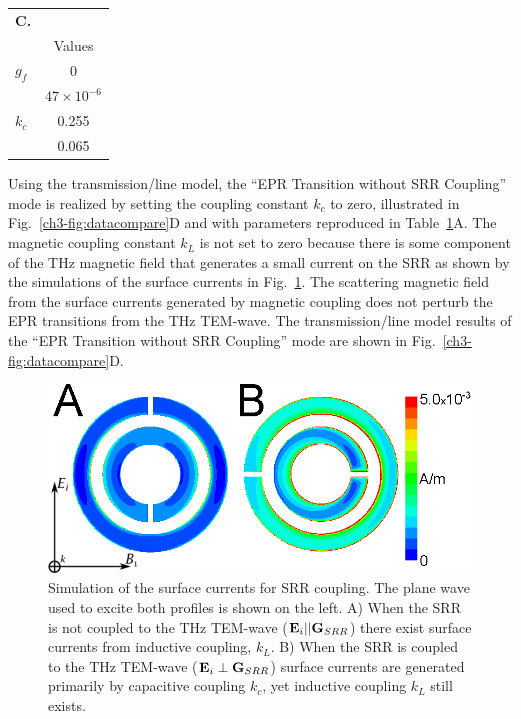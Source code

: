 \begin{table}[htp]
\begin{tabular}{ll}
\multicolumn{1}{r}{\textbf{{\Large C.}}}&{} \\
\multicolumn{1}{l|}{} & \multicolumn{1}{c}{Values} \\ \hline\hline
\multicolumn{1}{l|}{$g_f$} & \multicolumn{1}{c}{0} \\
\rowcolor[rgb]{0.937,0.937,0.937}  
\multicolumn{1}{l|}{$g_r$} & \multicolumn{1}{c}{$47\times 10^{-6}$} \\
\multicolumn{1}{l|}{$k_c$} & \multicolumn{1}{c}{0.255} \\
\rowcolor[rgb]{0.937,0.937,0.937}  
\multicolumn{1}{l|}{$k_L$} & \multicolumn{1}{c}{0.065} 
\end{tabular}\label{ch3-table:parameters}
\end{table}

Using the transmission\-/line model, the ``EPR Transition without SRR Coupling'' mode is realized by setting the coupling constant $k_c$ to zero, illustrated in Fig.~\ref{ch3-fig:datacompare}D and with parameters reproduced in Table~\ref{ch3-table:parameters}A. The magnetic coupling constant $k_L$ is not set to zero because there is some component of the THz magnetic field that generates a small current on the SRR as shown by the simulations of the surface currents in Fig.~\ref{ch3-fig:surfacecurrent}. The scattering magnetic field from the surface currents generated by magnetic coupling does not perturb the EPR transitions from the THz TEM-wave. The transmission\-/line model results of the ``EPR Transition without SRR Coupling'' mode are shown in Fig.~\ref{ch3-fig:datacompare}D.

\begin{figure}[htbp]\centering
  \includegraphics{Kapitel/Ch3-Images/SurfaceCurrent-THz.eps}%
  \caption[Simulation of the surface currents for SRR coupling.]{Simulation of the surface currents for SRR coupling. The plane wave used to excite both profiles is shown on the left. A) When the SRR is not coupled to the THz TEM-wave ($\textbf{E}_{i}||\textbf{G}_{SRR}$) there exist surface currents from inductive coupling, $k_L$. B) When the SRR is coupled to the THz TEM-wave ($\textbf{E}_{i}\perp\textbf{G}_{SRR}$) surface currents are generated primarily by capacitive coupling $k_c$, yet inductive coupling $k_L$ still exists.} \label{ch3-fig:surfacecurrent}
\end{figure}


